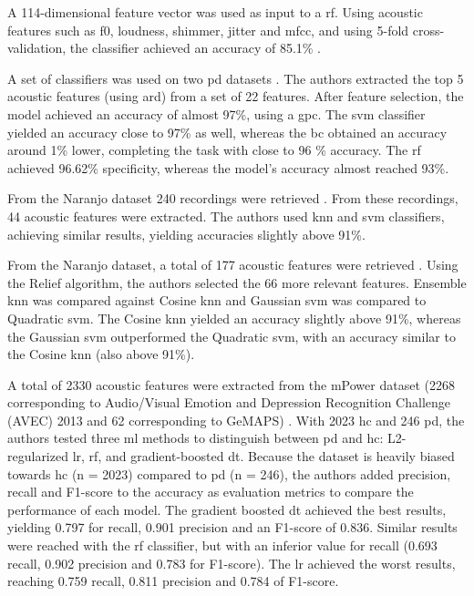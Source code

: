 A 114-dimensional feature vector was used as input to a \gls{rf}. Using acoustic features such as \gls{f0}, loudness, shimmer, jitter and \gls{mfcc}, and using 5-fold cross-validation, the classifier achieved an accuracy of 85.1\% \cite{parkinson_acoustic_pompilli}. 

A set of classifiers was used on two \gls{pd} datasets \cite{parkinson_acoustic_despotovic}. The authors extracted the top 5 acoustic features (using \gls{ard}) from a set of 22 features. After feature selection, the model achieved an accuracy of almost 97\%, using a \gls{gpc}. The \gls{svm} classifier yielded an accuracy close to 97\% as well, whereas the \gls{bc} obtained an accuracy around 1\% lower, completing the task with close to 96 \% accuracy. The \gls{rf} achieved 96.62\% specificity, whereas the model's accuracy almost reached 93\%.

From the Naranjo dataset \cite{naranjo_dataset} 240 recordings were retrieved \cite{parkinson_acoustic_yaman}. From these recordings, 44 acoustic features were extracted. The authors used \gls{knn} and \gls{svm} classifiers, achieving similar results, yielding accuracies slightly above 91\%.

From the Naranjo dataset, a total of 177 acoustic features were retrieved \cite{parkinson_acoustic_yaman}. Using the Relief algorithm, the authors selected the 66 more relevant features. Ensemble \gls{knn} was compared against Cosine \gls{knn} and Gaussian \gls{svm} was compared to Quadratic \gls{svm}. The Cosine \gls{knn} yielded an accuracy slightly above 91\%, whereas the Gaussian \gls{svm} outperformed the Quadratic \gls{svm}, with an accuracy similar to the Cosine \gls{knn} (also above 91\%).

A total of 2330 acoustic features were extracted from the mPower dataset \cite{mPower} (2268 corresponding to Audio/Visual Emotion and Depression Recognition Challenge (AVEC) 2013 and 62 corresponding to GeMAPS) \cite{parkinson_acoustic_tracy}. With 2023 \gls{hc} and 246 \gls{pd}, the authors tested three \gls{ml} methods to distinguish between \gls{pd} and \gls{hc}: L2-regularized \gls{lr}, \gls{rf}, and gradient-boosted \gls{dt}. Because the dataset is heavily biased towards \gls{hc} (n = 2023) compared to \gls{pd} (n = 246), the authors added precision, recall and F1-score to the accuracy as evaluation metrics to compare the performance of each model. The gradient boosted \gls{dt} achieved the best results, yielding 0.797 for recall, 0.901 precision and an F1-score of 0.836. Similar results were reached with the \gls{rf} classifier, but with an inferior value for recall (0.693 recall, 0.902 precision and 0.783 for F1-score). The \gls{lr} achieved the worst results, reaching 0.759 recall, 0.811 precision and 0.784 of F1-score.

